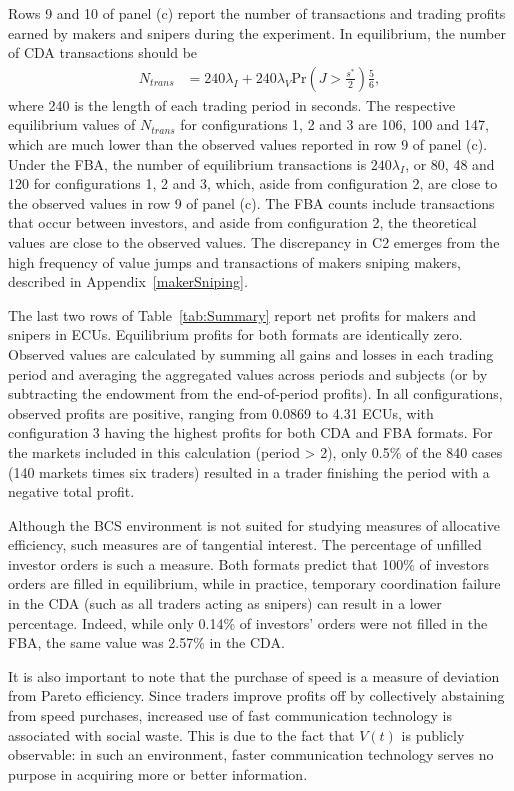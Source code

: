 \documentclass[12pt]{article}
\begin{document}
Rows 9 and 10 of panel (c) report the number of transactions and trading profits earned by makers and snipers during the experiment. In equilibrium, the number of CDA transactions should be
\begin{align}
\label{eq:CDA_trans}
N_{trans} & = 240 \lambda_I +  240 \lambda_V \textrm{Pr}\left(J > \frac{s^*}{2}\right) \frac{5}{6},
\end{align}
where 240 is the length of each trading period in seconds. The respective equilibrium values of $N_{trans}$ for configurations 1, 2 and 3 are 106, 100 and 147, which are much lower than the observed values reported in row 9 of panel (c). Under the FBA, the number of equilibrium transactions is $240 \lambda_I $, or 80, 48 and 120 for configurations 1, 2 and 3, which, aside from configuration 2, are close to the observed values in row 9 of panel (c). The FBA counts include transactions that occur between investors, and aside from configuration 2, the theoretical values are close to the observed values. 
The discrepancy in C2 emerges from the high frequency of value jumps and  transactions of makers sniping makers, described in Appendix~\ref{makerSniping}.

The last two rows of Table~\ref{tab:Summary} report net profits for makers and snipers in ECUs. Equilibrium profits for both formats are identically zero. Observed values are calculated by summing all gains and losses in each trading period and averaging the aggregated values across periods and subjects (or by subtracting the endowment from the end-of-period profits).  In all configurations, observed profits are positive, ranging from 0.0869 to 4.31 ECUs, with configuration 3 having the highest profits for both CDA and FBA formats. 
For the markets included in this calculation (period > 2), only 0.5\% of the 840 cases (140 markets times six traders) resulted in a trader finishing the period with a negative total profit.

Although the BCS environment is not suited for studying measures of allocative efficiency, such measures are of tangential interest. The percentage of unfilled investor orders is such a measure.  Both formats predict that 100\% of investors orders are filled in equilibrium, while in practice, temporary coordination failure in the CDA (such as all traders acting as snipers) can result in a lower percentage. Indeed, while only 0.14\% of investors' orders were not filled in the FBA, the same value was 2.57\% in the CDA.

It is also important to note that the purchase of speed is a measure of deviation from Pareto efficiency. Since traders improve profits off by collectively abstaining from speed purchases, increased use of fast communication technology is associated with social waste. This is due to the fact that $V(t)$ is publicly observable: in such an environment, faster communication technology serves no purpose in acquiring more or better information. 
\end{document}
